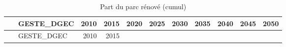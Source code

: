\documentclass[]{article}
\begin{document}
\begin{longtable}[]{@{}clrrrrrrrrr@{}}
\caption{Part du parc rénové (cumul)}\tabularnewline
\toprule
\begin{minipage}[b]{0.12\columnwidth}\centering\strut
~\strut
\end{minipage} & \begin{minipage}[b]{0.17\columnwidth}\raggedright\strut
GESTE\_DGEC\strut
\end{minipage} & \begin{minipage}[b]{0.05\columnwidth}\raggedleft\strut
2010\strut
\end{minipage} & \begin{minipage}[b]{0.05\columnwidth}\raggedleft\strut
2015\strut
\end{minipage} & \begin{minipage}[b]{0.05\columnwidth}\raggedleft\strut
2020\strut
\end{minipage} & \begin{minipage}[b]{0.05\columnwidth}\raggedleft\strut
2025\strut
\end{minipage} & \begin{minipage}[b]{0.05\columnwidth}\raggedleft\strut
2030\strut
\end{minipage} & \begin{minipage}[b]{0.05\columnwidth}\raggedleft\strut
2035\strut
\end{minipage} & \begin{minipage}[b]{0.05\columnwidth}\raggedleft\strut
2040\strut
\end{minipage} & \begin{minipage}[b]{0.05\columnwidth}\raggedleft\strut
2045\strut
\end{minipage} & \begin{minipage}[b]{0.05\columnwidth}\raggedleft\strut
2050\strut
\end{minipage}\tabularnewline
\midrule
\endfirsthead
\toprule
\begin{minipage}[b]{0.12\columnwidth}\centering\strut
~\strut
\end{minipage} & \begin{minipage}[b]{0.17\columnwidth}\raggedright\strut
GESTE\_DGEC\strut
\end{minipage} & \begin{minipage}[b]{0.05\columnwidth}\raggedleft\strut
2010\strut
\end{minipage} & \begin{minipage}[b]{0.05\columnwidth}\raggedleft\strut
2015\strut
\end{minipage} & \begin{minipage}[b]{0.05\columnwidth}\raggedleft\strut

\end{minipage}
\end{longtable}
\end{document}
